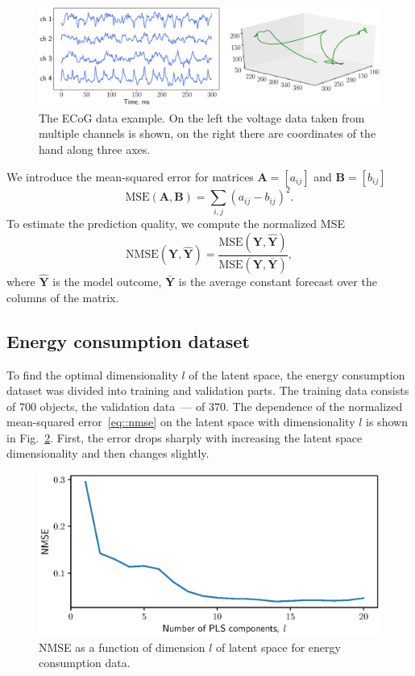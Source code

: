 \documentclass[12pt,twoside]{article}
\newcommand{\bY}{\mathbf{Y}}
\begin{document}
\begin{figure}
	\includegraphics[width=\linewidth]{figs/ecog_data.eps}
	\caption{The ECoG data example. On the left the voltage data taken from multiple channels is shown, on the right there are coordinates of the hand along three axes.}
	\label{fig::ecog_data}
\end{figure}

We introduce the mean-squared error for matrices $\mathbf{A} = [a_{ij}]$ and $\mathbf{B} = [b_{ij}]$ 
\[
\text{MSE} (\mathbf{A}, \mathbf{B}) = \sum_{i,j} (a_{ij} - b_{ij})^2.
\]
To estimate the prediction quality, we compute the normalized MSE 
\begin{equation}
\text{NMSE}(\bY,  \mathbf{\hat{Y}}) = \frac{\text{MSE} (\bY, \mathbf{\hat{Y}})}{\text{MSE} (\bY, \mathbf{\bar{Y}})},
\label{eq::nmse}
\end{equation}
where $\mathbf{\hat{Y}}$ is the model outcome, $\mathbf{\bar{Y}}$ is the average constant forecast over the columns of the matrix.

\subsection{Energy consumption dataset}

To find the optimal dimensionality $l$ of the latent space, the energy consumption dataset was divided into training and validation parts. 
The training data consists of $700$ objects, the validation data~--- of $370$. The dependence of the normalized mean-squared error~\eqref{eq::nmse} on the latent space with dimensionality $l$ is shown in Fig.~\ref{fig::energy_n_comp}. 
First, the error drops sharply with increasing the latent space dimensionality and then changes slightly.

\begin{figure}[!h]
	\centering
	\includegraphics[width=0.75\linewidth]{figs/energy_n_comp}
	\caption{NMSE as a function of dimension $l$ of latent space for energy consumption data.}
	\label{fig::energy_n_comp}
\end{figure}
\end{document}
